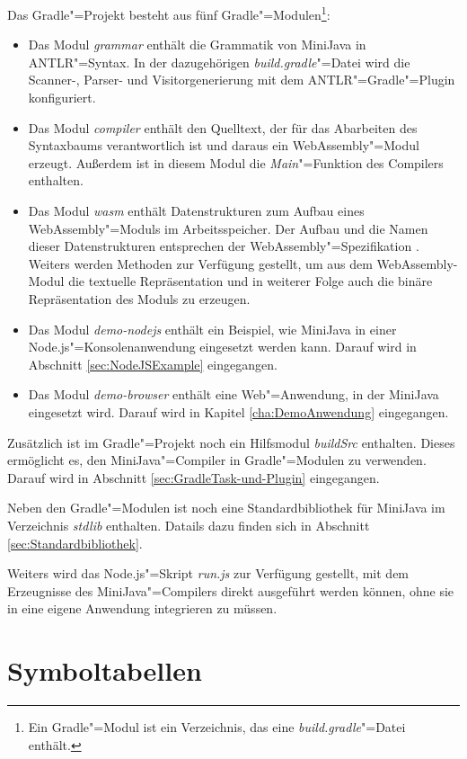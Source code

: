 Das Gradle"=Projekt besteht aus fünf Gradle"=Modulen\footnote{Ein Gradle"=Modul ist ein Verzeichnis, das eine \emph{build.gradle}"=Datei enthält.}:
\begin{itemize}
    \item Das Modul \emph{grammar} enthält die Grammatik von MiniJava in ANTLR"=Syntax. In der dazugehörigen \emph{build.gradle}"=Datei wird die Scanner-, Parser- und Visitorgenerierung mit dem ANTLR"=Gradle"=Plugin konfiguriert.
    \item Das Modul \emph{compiler} enthält den Quelltext, der für das Abarbeiten des Syntaxbaums verantwortlich ist und daraus ein WebAssembly"=Modul erzeugt. Außerdem ist in diesem Modul die \emph{Main}"=Funktion des Compilers enthalten.
    \item Das Modul \emph{wasm} enthält Datenstrukturen zum Aufbau eines WebAssembly"=Moduls im Arbeitsspeicher. Der Aufbau und die Namen dieser Datenstrukturen entsprechen der WebAssembly"=Spezifikation \cite{WebAssemblySpecification}. Weiters werden Methoden zur Verfügung gestellt, um aus dem WebAssembly-Modul die textuelle Repräsentation und in weiterer Folge auch die binäre Repräsentation des Moduls zu erzeugen.
    \item Das Modul \emph{demo-nodejs} enthält ein Beispiel, wie MiniJava in einer Node.js"=Konsolenanwendung eingesetzt werden kann. Darauf wird in Abschnitt \ref{sec:NodeJSExample} eingegangen.
    \item Das Modul \emph{demo-browser} enthält eine Web"=Anwendung, in der MiniJava eingesetzt wird. Darauf wird in Kapitel \ref{cha:DemoAnwendung} eingegangen.
\end{itemize}

Zusätzlich ist im Gradle"=Projekt noch ein Hilfsmodul \emph{buildSrc} enthalten. Dieses ermöglicht es, den MiniJava"=Compiler in Gradle"=Modulen zu verwenden. Darauf wird in Abschnitt \ref{sec:GradleTask-und-Plugin} eingegangen.

Neben den Gradle"=Modulen ist noch eine Standardbibliothek für MiniJava im Verzeichnis \emph{stdlib} enthalten. Datails dazu finden sich in Abschnitt \ref{sec:Standardbibliothek}.

Weiters wird das Node.js"=Skript \emph{run.js} zur Verfügung gestellt, mit dem Erzeugnisse des MiniJava"=Compilers direkt ausgeführt werden können, ohne sie in eine eigene Anwendung integrieren zu müssen.

\section{Symboltabellen}

